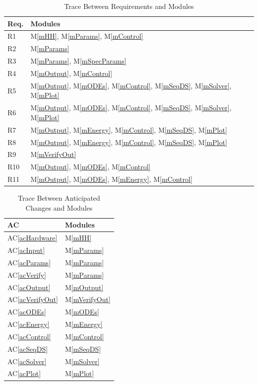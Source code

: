 \documentclass[12pt]{article}
\newcommand{\acref}[1]{AC\ref{#1}}
\newcommand{\mref}[1]{M\ref{#1}}
\begin{document}
\begin{table}[H]
\centering
\begin{tabular}{p{} p{}}
\toprule
\textbf{Req.} & \textbf{Modules}\\
\midrule
R1 & \mref{mHH}, \mref{mParams}, \mref{mControl}\\ %
R2 & \mref{mParams}\\ %
R3 & \mref{mParams}, \mref{mSpecParams}\\ %
R4 & \mref{mOutput}, \mref{mControl}\\
R5 & \mref{mOutput}, \mref{mODEs}, \mref{mControl}, \mref{mSeqDS}, \mref{mSolver}, \mref{mPlot}\\
R6 & \mref{mOutput}, \mref{mODEs}, \mref{mControl}, \mref{mSeqDS}, \mref{mSolver}, \mref{mPlot}\\
R7 & \mref{mOutput}, \mref{mEnergy}, \mref{mControl}, \mref{mSeqDS}, \mref{mPlot}\\
R8 & \mref{mOutput}, \mref{mEnergy}, \mref{mControl}, \mref{mSeqDS}, \mref{mPlot}\\
R9 & \mref{mVerifyOut}\\
R10 & \mref{mOutput}, \mref{mODEs}, \mref{mControl}\\
R11 & \mref{mOutput}, \mref{mODEs}, \mref{mEnergy}, \mref{mControl}\\
\bottomrule
\end{tabular}
\caption{Trace Between Requirements and Modules}
\label{TblRT}
\end{table}

\begin{table}[H]
\centering
\begin{tabular}{p{} p{}}
\toprule
\textbf{AC} & \textbf{Modules}\\
\midrule
\acref{acHardware} & \mref{mHH}\\
\acref{acInput} & \mref{mParams}\\ %
\acref{acParams} & \mref{mParams}\\
\acref{acVerify} & \mref{mParams}\\ %
\acref{acOutput} & \mref{mOutput}\\
\acref{acVerifyOut} & \mref{mVerifyOut}\\
\acref{acODEs} & \mref{mODEs}\\
\acref{acEnergy} & \mref{mEnergy}\\
\acref{acControl} & \mref{mControl}\\
\acref{acSeqDS} & \mref{mSeqDS}\\
\acref{acSolver} & \mref{mSolver}\\
\acref{acPlot} & \mref{mPlot}\\
\bottomrule
\end{tabular}
\caption{Trace Between Anticipated Changes and Modules}
\label{TblACT}
\end{table}
\end{document}
